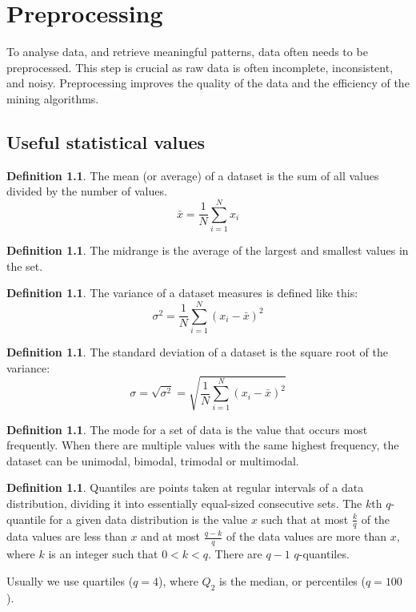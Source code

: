 \documentclass[12pt, openany]{report}
\theoremstyle{definition}
\newtheorem{definition}[thm]{Definition}
\begin{document}
\chapter{Preprocessing}
To analyse data, and retrieve meaningful patterns, data often needs to be preprocessed. This step is crucial as raw data is often incomplete, inconsistent, and noisy. Preprocessing improves the quality of the data and the efficiency of the mining algorithms.
\section{Useful statistical values}
\begin{definition}
    The mean (or average) of a dataset is the sum of all values divided by the number of values.
    \begin{equation}
        \bar{x} = \frac{1}{N} \sum_{i=1}^{N} x_i
    \end{equation}
\end{definition}
\begin{definition}
    The midrange is the average of the largest and smallest values in the set.
\end{definition}
\begin{definition}
    The variance of a dataset measures is defined like this:
    \begin{equation}
        \sigma^2 = \frac{1}{N} \sum_{i=1}^{N} (x_i - \bar{x})^2
    \end{equation}
\end{definition}
\begin{definition}
    The standard deviation of a dataset is the square root of the variance:
    \begin{equation}
        \sigma = \sqrt{\sigma^2} = \sqrt{\frac{1}{N} \sum_{i=1}^{N} (x_i - \bar{x})^2}
    \end{equation}
\end{definition}
\begin{definition}
    The mode for a set of data is the value that occurs most frequently. When there are multiple values with the same highest frequency, the dataset can be unimodal, bimodal, trimodal or multimodal.
\end{definition}
\begin{definition}
    Quantiles are points taken at regular intervals of a data distribution, dividing it into essentially equal-sized consecutive sets. The $k$th $q$-quantile for a given data distribution is the value $x$ such that at most $\frac{k}{q}$ of the data values are less than $x$ and at most $\frac{q-k}{q}$ of the data values are more than $x$, where $k$ is an integer such that $0 < k < q$. There are $q-1$ $q$-quantiles.
\end{definition}
Usually we use quartiles ($q=4$), where $Q_2$ is the median, or percentiles ($q=100$).
\end{document}
